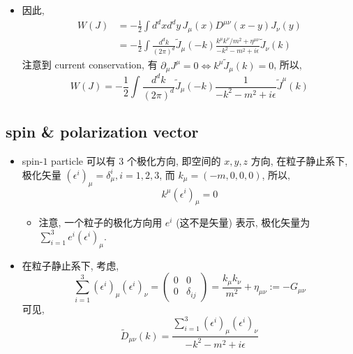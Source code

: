 \begin{itemize}
	\item 因此,
	\begin{align}
		W(J) &= - \frac{1}{2} \int d^d x d^d y \, J_\mu(x) D^{\mu \nu}(x - y) J_\nu(y) \\
		&= - \frac{1}{2} \int \frac{d^d k}{(2 \pi)^d} \tilde{J}_\mu(- k) \frac{k^\mu k^\nu / m^2 + \eta^{\mu \nu}}{- k^2 - m^2 + i \epsilon} \tilde{J}_\nu(k)
	\end{align}
	注意到 current conservation, 有 $\partial_\mu J^\mu = 0 \iff k^\mu \tilde{J}_\mu(k) = 0$, 所以,
	\begin{equation}
		W(J) = - \frac{1}{2} \int \frac{d^d k}{(2 \pi)^d} \tilde{J}_\mu(- k) \frac{1}{- k^2 - m^2 + i \epsilon} \tilde{J}^\mu(k)
	\end{equation}
\end{itemize}

\subsection{spin \& polarization vector} \label{3.1.1}
\begin{itemize}
	\item spin-$1$ particle 可以有 3 个极化方向, 即空间的 $x, y, z$ 方向, 在粒子静止系下, 极化矢量 $(\epsilon^i)_\mu = \delta^i_\mu, i = 1, 2, 3$, 而 $k_\mu = (- m, 0, 0, 0)$, 所以,
	\begin{equation}
		k^\mu (\epsilon^i)_\mu = 0
	\end{equation}
	\begin{itemize}
		\item 注意, 一个粒子的极化方向用 $e^i$ (这不是矢量) 表示, 极化矢量为 $\sum_{i = 1}^3 e^i (\epsilon^i)_\mu$.
	\end{itemize}
	
	\item 在粒子静止系下, 考虑,
	\begin{equation}
		\sum_{i = 1}^3 (\epsilon^i)_\mu (\epsilon^i)_\nu = \begin{pmatrix}
			0 & 0 \\
			0 & \delta_{i j}
		\end{pmatrix} = \frac{k_\mu k_\nu}{m^2} + \eta_{\mu \nu} := - G_{\mu \nu}
	\end{equation}
	可见,
	\begin{equation}
		\tilde{D}_{\mu \nu}(k) = \frac{\sum_{i = 1}^3 (\epsilon^i)_\mu (\epsilon^i)_\nu}{- k^2 - m^2 + i \epsilon}
	\end{equation}
\end{itemize}

